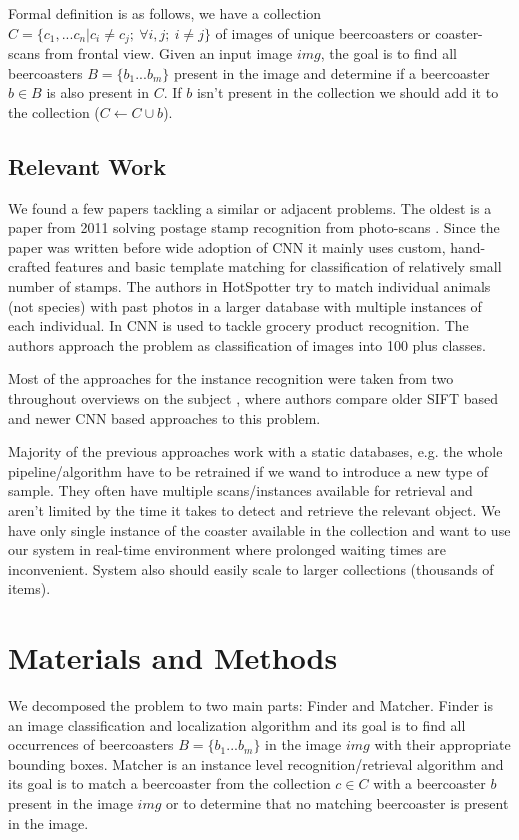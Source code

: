 \documentclass{article}
\begin{document}
Formal definition is as follows, we have a collection $C=\{c_1,...c_n | c_i \neq c_j;\ \forall i,j;\ i \neq j\}$ of images of unique beercoasters or coaster-scans from frontal view.
Given an input image $img$, the goal is to find all beercoasters $B=\{b_1...b_m\}$ present in the image 
and determine if a beercoaster $b \in B$ is also present in $C$. 
If $b$ isn't present in the collection we should add it to the collection ($C \leftarrow C \cup b$).

\subsection{Relevant Work}
We found a few papers tackling a similar or adjacent problems.
The oldest is a paper from 2011 solving postage stamp recognition from photo-scans \cite{}.
Since the paper was written before wide adoption of CNN it mainly uses custom, hand-crafted features and basic template matching for classification of relatively small number of stamps.
The authors in HotSpotter \cite{} try to match individual animals (not species) with past photos in a larger database with multiple instances of each individual.
In \cite{} CNN is used to tackle grocery product recognition. The authors approach the problem as classification of images into 100 plus classes.

Most of the approaches for the instance recognition were taken from two throughout overviews on the subject \cite{} \cite{},
where authors compare older SIFT based and newer CNN based approaches to this problem.


Majority of the previous approaches work with a static databases, e.g. the whole pipeline/algorithm have to be retrained if we wand to introduce a new type of sample.
They often have multiple scans/instances available for retrieval and aren't limited by the time it takes to detect and retrieve the relevant object.
We have only single instance of the coaster available in the collection and want to use our system in real-time environment where prolonged waiting times are inconvenient.
System also should easily scale to larger collections (thousands of items).

\section{Materials and Methods}
We decomposed the problem to two main parts: Finder and Matcher.
Finder is an image classification and localization algorithm and its goal is to find all
occurrences of beercoasters $B=\{b_1...b_m\}$ in the image $img$ with their appropriate bounding boxes.
Matcher is an instance level recognition/retrieval algorithm and its goal is to match 
a beercoaster from the collection $c \in C$ with a beercoaster $b$ present in the image $img$
or to determine that no matching beercoaster is present in the image.
\end{document}
